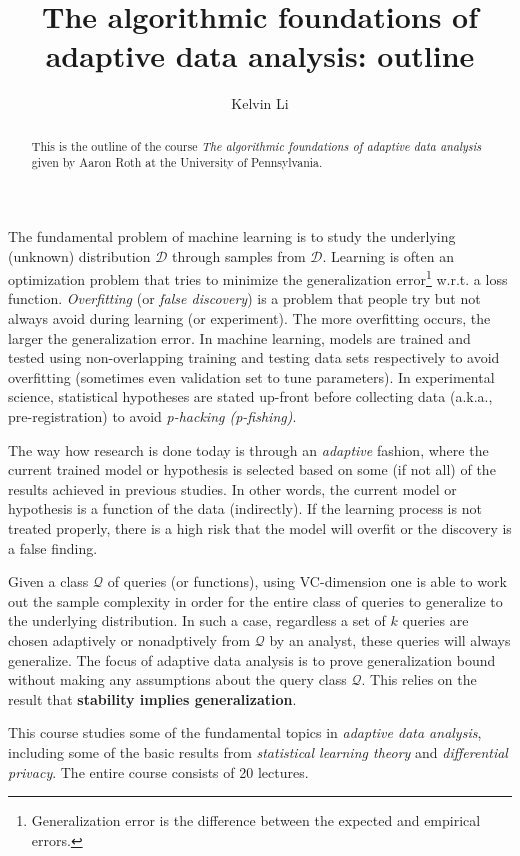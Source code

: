 \documentclass[]{article}
\title{The algorithmic foundations of adaptive data analysis: outline}
\author{Kelvin Li}
\begin{document}
\maketitle

\begin{abstract}
This is the outline of the course \textit{The algorithmic foundations of adaptive data analysis} given by Aaron Roth at the University of Pennsylvania. 
\end{abstract}

The fundamental problem of machine learning is to study the underlying (unknown) distribution $\mathcal{D}$ through samples from $\mathcal{D}$. Learning is often an optimization problem that tries to minimize the generalization error\footnote{Generalization error is the difference between the expected and empirical errors.} w.r.t. a loss function. \textit{Overfitting} (or \textit{false discovery}) is a problem that people try but not always avoid during learning (or experiment). The more overfitting occurs, the larger the generalization error. In machine learning, models are trained and tested using non-overlapping training and testing data sets respectively to avoid overfitting (sometimes even validation set to tune parameters). In experimental science, statistical hypotheses are stated up-front before collecting data (a.k.a., pre-registration) to avoid \textit{p-hacking (p-fishing)}. 

The way how research is done today is through an \textit{adaptive} fashion, where the current trained model or hypothesis is selected based on some (if not all) of the results achieved in previous studies. In other words, the current model or hypothesis is a function of the data (indirectly). If the learning process is not treated properly, there is a high risk that the model will overfit or the discovery is a false finding.

Given a class $\mathcal{Q}$ of queries (or functions), using VC-dimension one is able to work out the sample complexity in order for the entire class of queries to generalize to the underlying distribution. In such a case, regardless a set of $k$ queries are chosen adaptively or nonadptively from $\mathcal{Q}$ by an analyst, these queries will always generalize. The focus of adaptive data analysis is to prove generalization bound without making any assumptions about the query class $\mathcal{Q}$. This relies on the result that \textbf{stability implies generalization}.

This course studies some of the fundamental topics in \textit{adaptive data analysis}, including some of the basic results from \textit{statistical learning theory} and \textit{differential privacy}. The entire course consists of 20 lectures. 
\end{document}
